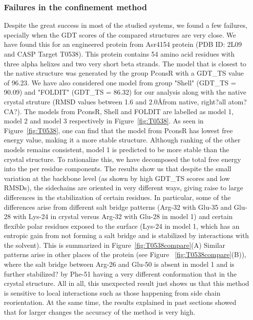\documentclass[12pt]{article}
\newcommand{\Alberto}[1]{\color{ForestGreen}#1\normalcolor }
\begin{document}
\subsubsection{Failures in the confinement method}

Despite the great success in most of the studied systems, we found a few failures, specially when
the GDT scores of the compared structures are
very close. We have found this for an engineered protein from Asr4154 protein (PDB ID: 2L09 and CASP Target T0538).
This protein contains 54 amino acid residues with three alpha helixes and two very short beta
strands. 
The model that is closest to the native structure was generated by the group PconsR with a GDT\_TS value of 96.23.
We have also considered one model from group "Shell" (GDT\_TS = 90.09) and "FOLDIT" (GDT\_TS = 86.32) for our analysis along with
the native crystal struture (RMSD values between 1.6 and 2.0\AA \Alberto{from native, right?all
atom? CA?}). The models from PconsR, Shell and FOLDIT are labelled as model 1, model 2 and model 3 
respectively in Figure~\ref{fig:T0538}. As seen in Figure~\ref{fig:T0538}, one can find that the 
model from PconsR has lowest free energy value, making it a more stable structure. Although ranking of the other models
remains consistent, model 1 is predicted to be more stable than the
crystal structure. To rationalize this, we have decomposed the total free energy into the per
residue components. The results show us that despite the small variation at the backbone level (as
shown by high GDT\_TS scores and low RMSDs), the sidechains are oriented in very different ways,
giving raise to large differences in the stabilization of certain residues.
In particular, some of the differences arise from different salt bridge patterns (Arg-32 with Glu-35
and Glu-28 with Lys-24
in crystal versus Arg-32 with Glu-28 in model 1) and certain flexible polar residues exposed to the
surface (Lys-24 in model 1, which has an entropic gain from not forming a salt bridge and is
stabilized by interactions with the solvent). This is summarized in Figure~\ref{fig:T0538compare}(A) 
Similar patterns arise in other places of the protein (see Figure ~\ref{fig:T0538compare}(B)), where
the salt bridge between Arg-26 and Glu-50 is absent in model 1 and is further \Alberto{stabilized?} by Phe-51
having a very different conformation that in the crystal structure.
All in all, this unexpected result just shows us that this method is sensitive to local interactions
such as those happening from side chain reorientation. At the same time, the results explained in
past sections showed that for larger changes the accuracy of the method is very high.
\end{document}
